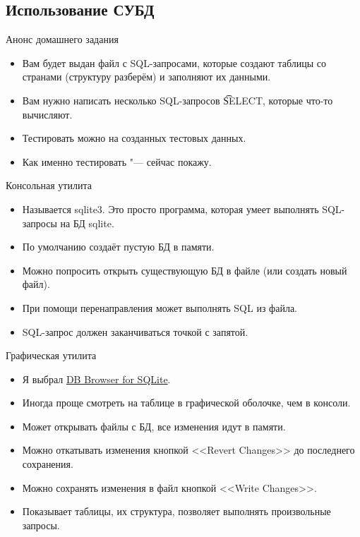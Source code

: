 \subsection{Использование СУБД}

\begin{frame}
\end{frame}

\begin{frame}{Анонс домашнего задания}
	\begin{itemize}
		\item Вам будет выдан файл с SQL-запросами, которые создают таблицы со странами (структуру разберём) и заполняют их данными.
		\item Вам нужно написать несколько SQL-запросов \t{SELECT}, которые что-то вычисляют.
		\item Тестировать можно на созданных тестовых данных.
		\item Как именно тестировать "--- сейчас покажу.
	\end{itemize}
\end{frame}

\begin{frame}{Консольная утилита}
	\begin{itemize}
		\item Называется sqlite3. Это просто программа, которая умеет выполнять SQL-запросы на БД sqlite.
		\item По умолчанию создаёт пустую БД в памяти.
		\item Можно попросить открыть существующую БД в файле (или создать новый файл).
		\item При помощи перенаправления может выполнять SQL из файла.
		\item SQL-запрос должен заканчиваться точкой с запятой.
	\end{itemize}
\end{frame}

\begin{frame}{Графическая утилита}
	\begin{itemize}
		\item Я выбрал \href{http://sqlitebrowser.org/}{DB Browser for SQLite}.
		\item Иногда проще смотреть на таблице в графической оболочке, чем в консоли.
		\item Может открывать файлы с БД, все изменения идут в памяти.
		\item Можно откатывать изменения кнопкой <<Revert Changes>> до последнего сохранения.
		\item Можно сохранять изменения в файл кнопкой <<Write Changes>>.
		\item Показывает таблицы, их структура, позволяет выполнять произвольные запросы.
	\end{itemize}
\end{frame}
